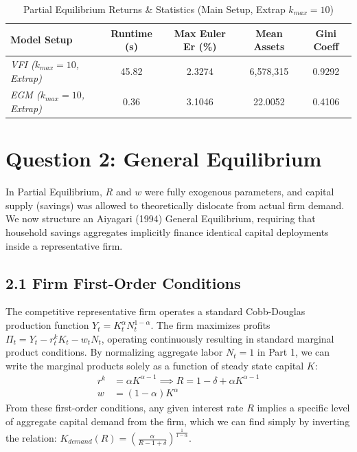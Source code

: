 \documentclass[11pt, a4paper]{article}
\begin{document}
\begin{table}[H]
\centering
\caption{Partial Equilibrium Returns \& Statistics (Main Setup, Extrap $k_{max}=10$)}
\label{tab:PE_results_Main}
\begin{tabular}{@{}lcccc@{}}
\toprule
\textbf{Model Setup} & \textbf{Runtime (s)} & \textbf{Max Euler Er (\%)} & \textbf{Mean Assets} & \textbf{Gini Coeff} \\ \midrule
\textit{VFI ($k_{max}=10$, Extrap)}  & 45.82 & 2.3274 & 6,578,315  & 0.9292 \\
\textit{EGM ($k_{max}=10$, Extrap)}  & 0.36  & 3.1046  & 22.0052 & 0.4106 \\ \bottomrule
\end{tabular}
\end{table}

\section*{Question 2: General Equilibrium}
In Partial Equilibrium, $R$ and $w$ were fully exogenous parameters, and capital supply (savings) was allowed to theoretically dislocate from actual firm demand. We now structure an Aiyagari (1994) General Equilibrium, requiring that household savings aggregates implicitly finance identical capital deployments inside a representative firm.

\subsection*{2.1 Firm First-Order Conditions}
The competitive representative firm operates a standard Cobb-Douglas production function $Y_t = K_t^\alpha N_t^{1-\alpha}$. The firm maximizes profits $\Pi_t = Y_t - r^k_t K_t - w_t N_t$, operating continuously resulting in standard marginal product conditions. 
By normalizing aggregate labor $N_t = 1$ in Part 1, we can write the marginal products solely as a function of steady state capital $K$:
\begin{align}
    r^k &= \alpha K^{\alpha - 1} \implies R = 1 - \delta + \alpha K^{\alpha - 1} \\
    w &= (1 - \alpha) K^\alpha
\end{align}
From these first-order conditions, any given interest rate $R$ implies a specific level of aggregate capital demand from the firm, which we can find simply by inverting the relation: $K_{demand}(R) = \left(\frac{\alpha}{R - 1 + \delta}\right)^{\frac{1}{1-\alpha}}$.
\end{document}
